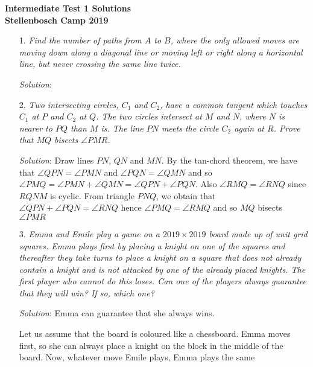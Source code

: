 \documentclass{article}
\begin{document}
\begin{center}
  \textbf{\Large Intermediate Test 1 Solutions}
  \\ \vspace{1em}
  \textbf{\large Stellenbosch Camp 2019}
\end{center}


\begin{enumerate}[1.]

\item[1.] %
\textit{Find the number of paths from $A$ to $B$, where the only allowed moves are moving down along a diagonal line or moving left or right along a horizontal line, but never crossing the same line twice.}

\textit{Solution}:
\vspace{6.81mm}

\item[2.] %
\textit{Two intersecting circles, $C_1$ and $C_2$, have a common tangent which touches $C_1$ at $P$ and $C_2$ at $Q$. The two circles intersect at $M$ and $N$, where $N$ is nearer to $PQ$ than $M$ is. The line $PN$ meets the circle $C_2$ again at $R$. Prove that $MQ$ bisects $\angle PMR$.}

\textit{Solution}: Draw lines $PN$, $QN$ and $MN$. By the tan-chord theorem, we have that $\angle QPN=\angle PMN$ and $\angle PQN=\angle QMN$ and so $\angle PMQ=\angle PMN+\angle QMN=\angle QPN+\angle PQN$. Also $\angle RMQ=\angle RNQ$ since $RQNM$ is cyclic. From triangle $PNQ$, we obtain that $\angle QPN+\angle PQN= \angle RNQ$ hence $\angle PMQ=\angle RMQ$ and so $MQ$ bisects $\angle PMR$ 
\vspace{6.81mm}

\item[3.] %
\textit{Emma and Emile play a game on a $2019 \times 2019$ board made up of unit grid squares. Emma plays first by placing a knight on one of the squares and thereafter they take turns to place a knight on a square that does not already contain a knight and is not attacked by one of the already placed knights. The first player who cannot do this loses. Can one of the players always guarantee that they will win? If so, which one? }

\textit{Solution}:
Emma can guarantee that she always wins.

Let us assume that the board is coloured like a chessboard. Emma moves first, so she can always place a knight on the block in the middle of the board. Now, whatever move Emile plays, Emma plays the same 
\vspace{6.81mm}


\end{enumerate}
\end{document}
